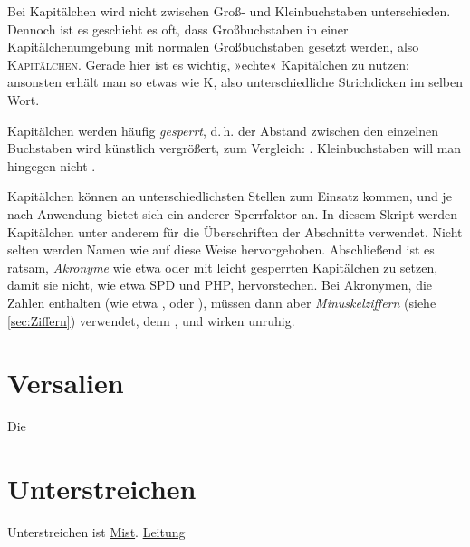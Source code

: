 Bei Kapitälchen wird nicht zwischen Groß- und Kleinbuchstaben
unterschieden. Dennoch ist es geschieht es oft, dass Großbuchstaben in einer
Kapitälchenumgebung mit normalen Großbuchstaben gesetzt werden, also
\textsc{Kapitälchen}. Gerade hier ist es wichtig, »echte« Kapitälchen zu
nutzen; ansonsten erhält man so etwas wie K, also
unterschiedliche Strichdicken im selben Wort.

Kapitälchen werden häufig \emph{gesperrt}, d.\,h. der Abstand zwischen den
einzelnen Buchstaben wird künstlich vergrößert, zum Vergleich:
. Kleinbuchstaben will man hingegen nicht
.

Kapitälchen können an unterschiedlichsten Stellen zum Einsatz kommen, und je
nach Anwendung bietet sich ein anderer Sperrfaktor an. In diesem Skript werden
Kapitälchen unter anderem für die Überschriften der Abschnitte verwendet. Nicht
selten werden Namen wie  auf
diese Weise hervorgehoben. Abschließend ist es ratsam, \emph{Akronyme} wie etwa
 oder  mit leicht gesperrten Kapitälchen zu setzen, damit sie
nicht, wie etwa SPD und PHP, hervorstechen. Bei Akronymen, die Zahlen enthalten
(wie etwa ,  oder ), müssen dann aber
\emph{Minuskelziffern} (siehe \cref{sec:Ziffern}) verwendet, denn
,  und
 wirken unruhig.

\section{Versalien}

Die

\section{Unterstreichen}

Unterstreichen ist \underline{Mist}. \underline{Leitung} \underline{}




